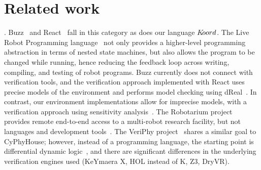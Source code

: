     
    \section{Related work}
    \label{sec:related}
    . 
%
Buzz~\cite{Buzzlanguage} and React~\cite{reactlang} fall in this category as does our language $K\kern-2pt oord$. 
The Live Robot Programming language~\cite{campusanofabry:lrp2016} not only provides a higher-level programming abstraction in terms of nested state machines, but also allows the program to be changed while running, hence reducing the feedback loop across writing, compiling, and testing of robot programs. 
Buzz currently does not  connect with  verification tools, and the verification approach implemented with React uses precise models of the environment and performs model checking using dReal~\cite{Gao2013}. 
In contrast, our environment implementations allow for imprecise models, with a verification approach using sensitivity analysis~\cite{DryVR2017}.
%
%
%
%
The Robotarium project provides remote end-to-end access to a  multi-robot research facility, but not languages and development tools~\cite{robotarium}. 
The  VeriPhy project~\cite{Bohrer:2018:VVC:3192366.3192406} shares a similar goal to CyPhyHouse; however, instead of a programming language, the starting point is differential dynamic logic~\cite{Bohrer:2017:FVD:3018610.3018616},  and there are significant differences  in the underlying verification engines used (KeYmaera X, HOL instead of K, Z3, DryVR).
%

